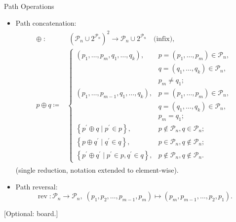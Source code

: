 \documentclass[
  size=8pt,
  style=klope,
  paper=screen,
  pauseslide,
  nopagebreaks,
  hlsections,
  fleqn
]{powerdot}
\def\board{{\color{green} [Optional: board.]}}
\begin{document}
\begin{slide}[toc=]{Path Operations}
\begin{itemize}
  \item
  Path concatenation:
  \begin{align}
    \begin{split}
    \oplus \; : & \; {\left( \mathcal{P}_n \cup 2^{\mathcal{P}_n} \right)}^2 \to \mathcal{P}_n \cup 2^{\mathcal{P}_n} \quad \text{(infix)},
    \\
    p \oplus q \coloneqq &
    \begin{cases}
      \left(p_1,\ldots,p_m,q_1,\ldots,q_k\right),
      & p = \left(p_1,\ldots,p_m\right) \in \mathcal{P}_n, \\
      & q = \left(q_1,\ldots,q_k\right) \in \mathcal{P}_n, \\
      & p_m \neq q_1;
      \\
      \left(p_1,\ldots,p_{m-1},q_1,\ldots,q_k\right),
      & p = \left(p_1,\ldots,p_m\right) \in \mathcal{P}_n, \\
      & q = \left(q_1,\ldots,q_k\right) \in \mathcal{P}_n, \\
      & p_m = q_1;
      \\
      \left\{p^\prime \oplus q \; \vert \; p^\prime \in p\right\},
      & p \notin \mathcal{P}_n, q \in \mathcal{P}_n;
      \\
      \left\{p \oplus q^\prime \; \vert \; q^\prime \in q\right\},
      & p \in \mathcal{P}_n, q \notin \mathcal{P}_n;
      \\
      \left\{p^\prime \oplus q^\prime \; \vert \; p^\prime \in p, q^\prime \in q\right\},
      & p \notin \mathcal{P}_n, q \notin \mathcal{P}_n.
    \end{cases}
    \end{split}
  \end{align}
  (single reduction, notation extended to element-wise).
  \item Path reversal:
    \begin{equation}
      \operatorname{rev} : \mathcal{P}_n \to \mathcal{P}_n, \;
      \left(p_1,p_2,\ldots,p_{m-1},p_m\right) \mapsto \left(p_m,p_{m-1},\ldots,p_2,p_1\right).
    \end{equation}
\end{itemize}
\board
\end{slide}
\end{document}
